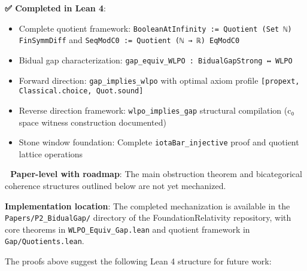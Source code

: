 \documentclass[11pt]{article}
\theoremstyle{definition}
\theoremstyle{remark}
\begin{document}
\textbf{✅ Completed in Lean 4}:
\begin{itemize}
\item Complete quotient framework: \texttt{BooleanAtInfinity := Quotient (Set ℕ) FinSymmDiff} and \texttt{SeqModC0 := Quotient (ℕ → ℝ) EqModC0}
\item Bidual gap characterization: \texttt{gap\_equiv\_WLPO : BidualGapStrong ↔ WLPO}
\item Forward direction: \texttt{gap\_implies\_wlpo} with optimal axiom profile \texttt{[propext, Classical.choice, Quot.sound]}
\item Reverse direction framework: \texttt{wlpo\_implies\_gap} structural compilation (c₀ space witness construction documented)
\item Stone window foundation: Complete \texttt{iotaBar\_injective} proof and quotient lattice operations
\end{itemize}

\textbf{🔧 Paper-level with roadmap}: The main obstruction theorem and bicategorical coherence structures outlined below are not yet mechanized.

\textbf{Implementation location}: The completed mechanization is available in the \texttt{Papers/P2\_BidualGap/} directory of the FoundationRelativity repository, with core theorems in \texttt{WLPO\_Equiv\_Gap.lean} and quotient framework in \texttt{Gap/Quotients.lean}.

The proofs above suggest the following Lean 4 structure for future work:
\end{document}
